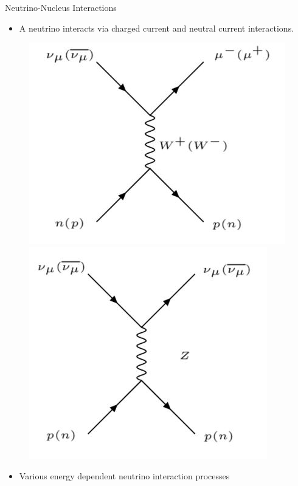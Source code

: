 \documentclass[9pt]{beamer}    %
\begin{document}
\begin{frame}{Neutrino-Nucleus Interactions}
\begin{itemize}
 \item \small{A neutrino interacts via charged current and neutral current interactions.}
\end{itemize}

\begin{figure}[!htb]
   \begin{minipage}{0.48\textwidth}
     \centering
     \includegraphics[width=.62\linewidth]{ccfig.jpg}

   \end{minipage}\hfill
   \begin{minipage}{0.48\textwidth}
     \centering
     \includegraphics[width=.62\linewidth]{ncfig.jpg}

   \end{minipage}
   \end{figure}
\begin{itemize}
 \item \small{Various energy dependent neutrino interaction processes}
\end{itemize}


\end{frame}
\end{document}
